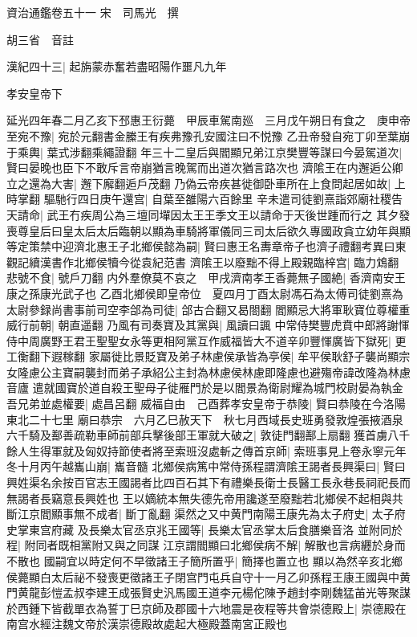 資治通鑑卷五十一
宋　司馬光　撰

胡三省　音註

漢紀四十三|{
	起旃蒙赤奮若盡昭陽作噩凡九年}


孝安皇帝下

延光四年春二月乙亥下邳惠王衍薨　甲辰車駕南廵　三月戊午朔日有食之　庚申帝至宛不豫|{
	宛於元翻書金縢王有疾弗豫孔安國注曰不悦豫}
乙丑帝發自宛丁卯至葉崩于乘輿|{
	葉式涉翻乘繩證翻}
年三十二皇后與閻顯兄弟江京樊豐等謀曰今晏駕道次|{
	賢曰晏晚也臣下不敢斥言帝崩猶言晚駕而出道次猶言路次也}
濟隂王在内邂逅公卿立之還為大害|{
	邂下廨翻逅戶茂翻}
乃偽云帝疾甚徙御卧車所在上食問起居如故|{
	上時掌翻}
驅馳行四日庚午還宫|{
	自葉至雒陽六百餘里}
辛未遣司徒劉熹詣郊廟社稷告天請命|{
	武王冇疾周公為三壇同墠因太王王季文王以請命于天後世踵而行之}
其夕發喪尊皇后曰皇太后太后臨朝以顯為車騎將軍儀同三司太后欲久專國政貪立幼年與顯等定策禁中迎濟北惠王子北鄉侯懿為嗣|{
	賢曰惠王名夀章帝子也濟子禮翻考異曰東觀記續漢書作北鄉侯犢今從袁紀范書}
濟隂王以廢黜不得上殿親臨梓宫|{
	臨力鴆翻}
悲號不食|{
	號戶刀翻}
内外羣僚莫不哀之　甲戌濟南孝王香薨無子國絶|{
	香濟南安王康之孫康光武子也}
乙酉北鄉侯即皇帝位　夏四月丁酉太尉馮石為太傅司徒劉熹為太尉參録尚書事前司空李郃為司徒|{
	郃古合翻又曷閤翻}
閻顯忌大將軍耿寶位尊權重威行前朝|{
	朝直遥翻}
乃風有司奏寶及其黨與|{
	風讀曰諷}
中常侍樊豐虎賁中郎將謝惲侍中周廣野王君王聖聖女永等更相阿黨互作威福皆大不道辛卯豐惲廣皆下獄死|{
	更工衡翻下遐稼翻}
家屬徙比景貶寶及弟子林慮侯承皆為亭侯|{
	牟平侯耿舒子襲尚顯宗女隆慮公主寶嗣襲封而弟子承紹公主封為林慮侯林慮即隆慮也避殤帝諱改隆為林慮音廬}
遣就國寶於道自殺王聖母子徙雁門於是以閻景為衛尉耀為城門校尉晏為執金吾兄弟並處權要|{
	處昌呂翻}
威福自由　己酉葬孝安皇帝于恭陵|{
	賢曰恭陵在今洛陽東北二十七里}
廟曰恭宗　六月乙巳赦天下　秋七月西域長史班勇發敦煌張掖酒泉六千騎及鄯善疏勒車師前部兵擊後部王軍就大破之|{
	敦徒門翻鄯上扇翻}
獲首虜八千餘人生得軍就及匈奴持節使者將至索班沒處斬之傳首京師|{
	索班事見上卷永寧元年}
冬十月丙午越巂山崩|{
	巂音髓}
北鄉侯病篤中常侍孫程謂濟隂王謁者長興渠曰|{
	賢曰興姓渠名余按百官志王國謁者比四百石其下有禮樂長衛士長醫工長永巷長祠祀長而無謁者長竊意長興姓也}
王以嫡統本無失德先帝用讒遂至廢黜若北鄉侯不起相與共斷江京閻顯事無不成者|{
	斷丁亂翻}
渠然之又中黄門南陽王康先為太子府史|{
	太子府史掌東宫府藏}
及長樂太官丞京兆王國等|{
	長樂太官丞掌太后食膳樂音洛}
並附同於程|{
	附同者既相黨附又與之同謀}
江京謂閻顯曰北鄉侯病不解|{
	解散也言病纒於身而不散也}
國嗣宜以時定何不早徵諸王子簡所置乎|{
	簡擇也置立也}
顯以為然辛亥北鄉侯薨顯白太后祕不發喪更徵諸王子閉宫門屯兵自守十一月乙卯孫程王康王國與中黄門黄龍彭愷孟叔李建王成張賢史汎馬國王道李元楊佗陳予趙封李剛魏猛苖光等聚謀於西鍾下皆截單衣為誓丁巳京師及郡國十六地震是夜程等共會崇德殿上|{
	崇德殿在南宫水經注魏文帝於漢崇德殿故處起大極殿蓋南宮正殿也}
